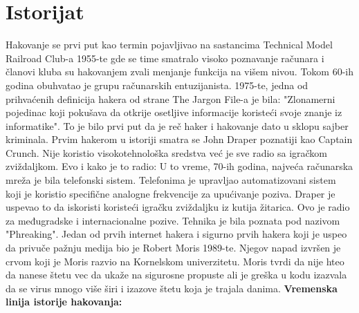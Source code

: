 \documentclass[a4paper]{article}
\begin{document}
\section{Istorijat}
Hakovanje se prvi put kao termin pojavljivao na sastancima Technical Model Railroad Club-a 1955-te gde se time smatralo visoko poznavanje računara i članovi kluba su hakovanjem zvali menjanje funkcija na višem nivou.
\newline
Tokom 60-ih godina obuhvatao je grupu računarskih entuzijanista. 1975-te, jedna od prihvaćenih definicija hakera od strane The Jargon File-a je bila: "Zlonamerni pojedinac koji pokušava da otkrije osetljive informacije koristeći svoje znanje iz informatike". To je bilo prvi put da je reč haker i hakovanje dato u sklopu sajber kriminala.
\newline
Prvim hakerom u istoriji smatra se John Draper poznatiji kao Captain Crunch. Nije koristio visokotehnološka sredstva već je sve radio sa igračkom zviždaljkom. Evo i kako je to radio: U to vreme, 70-ih godina, najveća računarska mreža je bila telefonski sistem. Telefonima je upravljao automatizovani sistem koji je koristio specifične  analogne frekvencije za upućivanje poziva. Draper je uspevao to da iskoristi koristeći igračku zviždaljku iz kutija žitarica. Ovo je radio za međugradske i internacionalne pozive. Tehnika je bila poznata pod nazivom "Phreaking".
\newline
Jedan od prvih internet hakera i sigurno prvih hakera koji je uspeo da privuče pažnju medija bio je Robert Moris 1989-te. Njegov napad izvršen je crvom koji je Moris razvio na Kornelskom univerzitetu. Moris tvrdi da nije hteo da nanese štetu vec da ukaže na sigurosne propuste ali je greška u kodu izazvala da se virus mnogo više širi i izazove štetu koja je trajala danima.
\newline
\newline
 \textbf{Vremenska linija istorije hakovanja:}
\end{document}
